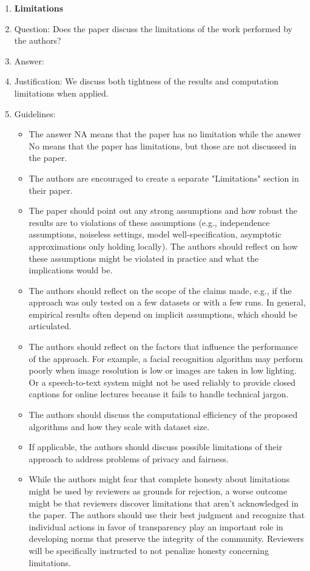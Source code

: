 \documentclass{article}
\theoremstyle{plain}
\theoremstyle{definition}
\begin{document}
\begin{enumerate}
\item {\bf Limitations}
    \item[] Question: Does the paper discuss the limitations of the work performed by the authors?
    \item[] Answer: \answerYes{}
    \item[] Justification: We discuss both tightness of the results and computation limitations when applied.
    \item[] Guidelines:
    \begin{itemize}
        \item The answer NA means that the paper has no limitation while the answer No means that the paper has limitations, but those are not discussed in the paper. 
        \item The authors are encouraged to create a separate "Limitations" section in their paper.
        \item The paper should point out any strong assumptions and how robust the results are to violations of these assumptions (e.g., independence assumptions, noiseless settings, model well-specification, asymptotic approximations only holding locally). The authors should reflect on how these assumptions might be violated in practice and what the implications would be.
        \item The authors should reflect on the scope of the claims made, e.g., if the approach was only tested on a few datasets or with a few runs. In general, empirical results often depend on implicit assumptions, which should be articulated.
        \item The authors should reflect on the factors that influence the performance of the approach. For example, a facial recognition algorithm may perform poorly when image resolution is low or images are taken in low lighting. Or a speech-to-text system might not be used reliably to provide closed captions for online lectures because it fails to handle technical jargon.
        \item The authors should discuss the computational efficiency of the proposed algorithms and how they scale with dataset size.
        \item If applicable, the authors should discuss possible limitations of their approach to address problems of privacy and fairness.
        \item While the authors might fear that complete honesty about limitations might be used by reviewers as grounds for rejection, a worse outcome might be that reviewers discover limitations that aren't acknowledged in the paper. The authors should use their best judgment and recognize that individual actions in favor of transparency play an important role in developing norms that preserve the integrity of the community. Reviewers will be specifically instructed to not penalize honesty concerning limitations.
    \end{itemize}


\end{enumerate}
\end{document}
